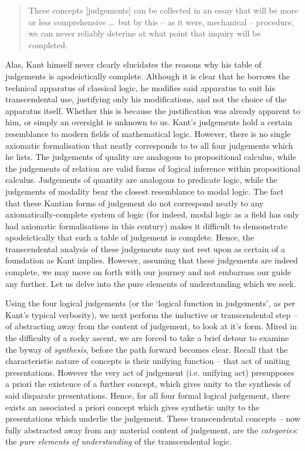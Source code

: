 \begin{quote}
  These concepts [judgements] can be collected in an essay that will be more or less comprehensive \ldots\ but by this -- as it were, mechanical -- procedure, we can never reliably deterine at what point that inquiry will be completed.

  \autocite[B92]{hackett}
\end{quote}

\noindent
Alas, Kant himself never clearly elucidates the reasons why his table of judgements is apodeictically complete. Although it is clear that he borrows the technical apparatus of classical logic, he modifies said apparatus to suit his transcendental use, justifying only his modifications, and not the choice of the apparatus itself. Whether this is because the justification was already apparent to him, or simply an oversight is unknown to us. Kant's judgements hold a certain resemblance to modern fields of mathematical logic. However, there is no single axiomatic formalisation that neatly corresponds to to all four judgements which he lists. The judgements of quality are analogous to propositional calculus, while the judgements of relation are valid forms of logical inference within propositional calculus. Judgements of quantity are analogous to predicate logic, while the judgements of modality bear the closest resemblance to modal logic. The fact that these Kantian forms of judgement do not correspond neatly to any axiomatically-complete system of logic (for indeed, modal logic as a field has only had axiomatic formalisations in this century) makes it difficult to demonstrate apodeictically that such a table of judgement is complete. Hence, the transcendental analysis of these judgements may not rest upon as certain of a foundation as Kant implies. However, assuming that these judgements are indeed complete, we may move on forth with our journey and not embarrass our guide any further. Let us delve into the pure elements of understanding which we seek.

Using the four logical judgements (or the `logical function in judgements', as per Kant's typical verbosity), we next perform the inductive or transcendental step -- of abstracting away from the content of judgement, to look at it's form. Mired in the difficulty of a rocky ascent, we are forced to take a brief detour to examine the byway of \emph{synthesis}, before the path forward becomes clear. Recall that the characteristic nature of concepts is their unifying function -- that act of uniting presentations. However the very act of judgement (i.e. unifying act) presupposes a priori the existence of a further concept, which gives unity to the synthesis of said disparate presentations. Hence, for all four formal logical judgement, there exists an associated a priori concept which gives synthetic unity to the presentations which underlie the judgement. These transcendental concepts -- now fully abstracted away from any material content of judgement, are the \emph{categories}: the \emph{pure elements of understanding} of the transcendental logic.

